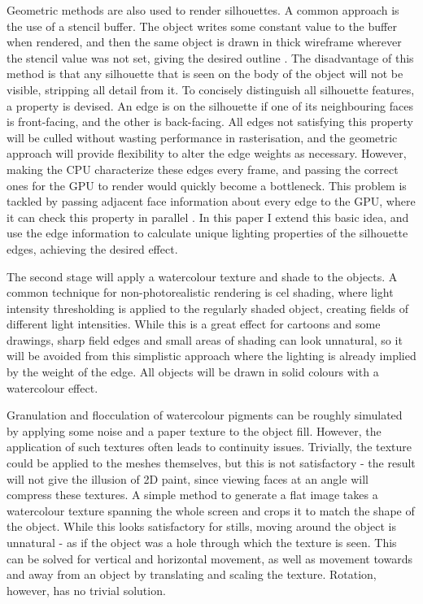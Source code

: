 \documentclass[a4paper,10pt]{article}
\begin{document}
Geometric methods are also used to render silhouettes. A common approach is the use of a stencil buffer. The object writes some constant value to the buffer when rendered, and then the same object is drawn in thick wireframe wherever the stencil value was not set, giving the desired outline \cite{McGuire2004}. The disadvantage of this method is that any silhouette that is seen on the body of the object will not be visible, stripping all detail from it. To concisely distinguish all silhouette features, a property is devised. An edge is on the silhouette if one of its neighbouring faces is front-facing, and the other is back-facing. All edges not satisfying this property will be culled without wasting performance in rasterisation, and the geometric approach will provide flexibility to alter the edge weights as necessary. However, making the CPU characterize these edges every frame, and passing the correct ones for the GPU to render would quickly become a bottleneck. This problem is tackled by passing adjacent face information about every edge to the GPU, where it can check this property in parallel \cite{Hughes2004}. In this paper I extend this basic idea, and use the edge information to calculate unique lighting properties of the silhouette edges, achieving the desired effect.

The second stage will apply a watercolour texture and shade to the objects. A common technique for non-photorealistic rendering is cel shading, where light intensity thresholding is applied to the regularly shaded object, creating fields of different light intensities. While this is a great effect for cartoons and some drawings, sharp field edges and small areas of shading can look unnatural, so it will be avoided from this simplistic approach where the lighting is already implied by the weight of the edge. All objects will be drawn in solid colours with a watercolour effect.

Granulation and flocculation of watercolour pigments \cite{Curtis1997} can be roughly simulated by applying some noise and a paper texture to the object fill. However, the application of such textures often leads to continuity issues. Trivially, the texture could be applied to the meshes themselves, but this is not satisfactory - the result will not give the illusion of 2D paint, since viewing faces at an angle will compress these textures. A simple method to generate a flat image takes a watercolour texture spanning the whole screen and crops it to match the shape of the object. While this looks satisfactory for stills, moving around the object is unnatural - as if the object was a hole through which the texture is seen. This can be solved for vertical and horizontal movement, as well as movement towards and away from an object by translating and scaling the texture. Rotation, however, has no trivial solution.
\end{document}
